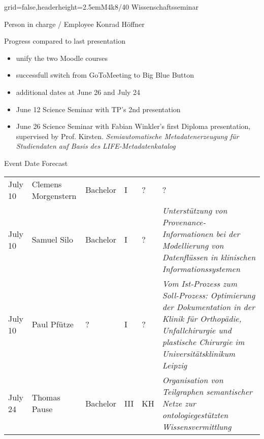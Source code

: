 \documentclass[english]{kiesgrube}
\begin{document}

\newpage

\begin{poster}{grid=false,headerheight=2.5em}{}{M4k8/40 Wissenschaftsseminar}{}{}
\begin{posterbox}[name=person,column=0,row=0]{Person in charge / Employee}
Konrad Höffner
\end{posterbox}
\begin{posterbox}[name=progress,below=person]{Progress compared to last presentation}
\footnotesize
\begin{itemize}
\item unify the two Moodle courses
\item successfull switch from GoToMeeting to Big Blue Button
\item additional dates at June 26 and July 24
\item June 12 	Science Seminar with TP's 2nd presentation
\item June 26 	Science Seminar with Fabian Winkler's first Diploma presentation, supervised by Prof. Kirsten. \emph{Semiautomatische Metadatenerzeugung für Studiendaten auf Basis des LIFE-Metadatenkatalog}
\end{itemize}
\end{posterbox}
\begin{posterbox}[name=event,below=progress,span=2]{Event Date Forecast}
\small
\begin{tabulary}{\textwidth}{lllllL}
July 10	&Clemens Morgenstern		&Bachelor	&I		&?	&?\\
July 10	&Samuel Silo			&Bachelor	&I		&?	&\emph{Unterstützung von Provenance-Informationen bei der Modellierung von Datenflüssen in klinischen Informationssystemen}\\
July 10	&Paul Pfütze			&?		&I		&?	&\emph{Vom Ist-Prozess zum Soll-Prozess: Optimierung der Dokumentation in der Klinik für Orthopädie, Unfallchirurgie und plastische Chirurgie im Universitätsklinikum Leipzig}\\
July 24 &Thomas Pause			&Bachelor	&III		&KH	&\emph{Organisation von Teilgraphen semantischer Netze zur ontologiegestützten Wissensvermittlung}\\

\end{tabulary}
\end{posterbox}
\end{poster}
\end{document}
